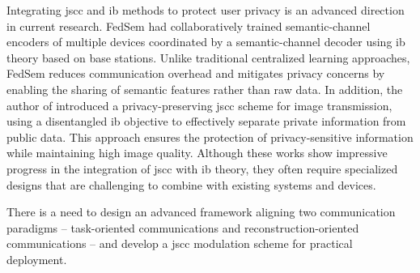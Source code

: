 Integrating \gls{jscc} and \gls{ib} methods to protect user privacy is an advanced direction in current research. FedSem \cite{Wei_2023_FSL} had collaboratively trained semantic-channel encoders of multiple devices coordinated by a semantic-channel decoder using \gls{ib} theory based on base stations. Unlike traditional centralized learning approaches, FedSem reduces communication overhead and mitigates privacy concerns by enabling the sharing of semantic features rather than raw data. In addition, the author of \cite{Sun_2024_DIB} introduced a privacy-preserving \gls{jscc} scheme for image transmission, using a disentangled \gls{ib} objective to effectively separate private information from public data. This approach ensures the protection of privacy-sensitive information while maintaining high image quality. Although these works show impressive progress in the integration of \gls{jscc} with \gls{ib} theory, they often require specialized designs that are challenging to combine with existing systems and devices.

There is a need to design an advanced framework aligning two communication paradigms -- task-oriented communications and reconstruction-oriented communications -- and develop a \gls{jscc} modulation scheme for practical deployment.

    
